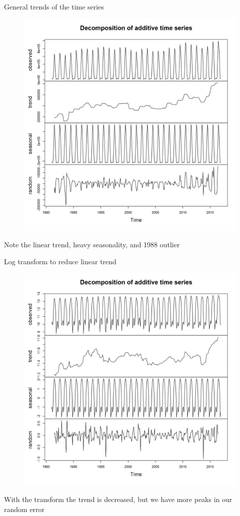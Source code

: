 \documentclass[xcolor=dvipsnames]{beamer}
\begin{document}
\begin{frame}{General trends of the time series}
\begin{figure}
\centering\includegraphics[width=.57\linewidth]{../normalplots/visits-components-ts-plot.png}
\end{figure}

\vfill 
\footnotesize Note the linear trend, heavy seasonality, and 1988 outlier

\end{frame}

\begin{frame}{Log transform to reduce linear trend}
\begin{figure}
\centering\includegraphics[width=.57\linewidth]{../normalplots/Logvisits-ts-plot.png}
\end{figure}

\vfill 
\footnotesize With the transform the trend is decreased, but we have more peaks in our random error
\end{frame}
\end{document}
